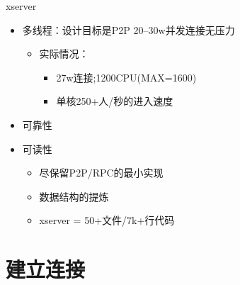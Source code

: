 \documentclass{beamer}
\begin{document}
\begin{frame}[t]{xserver}
    \begin{itemize}
        \item 多线程：设计目标是P2P 20--30w并发连接无压力
            \begin{itemize}
                \item 实际情况：
                    \begin{itemize}
                        \item 27w连接;1200CPU(MAX=1600)
                        \item 单核250+人/秒的进入速度
                    \end{itemize}
            \end{itemize}
        \item 可靠性
        \item 可读性
            \begin{itemize}
                \item 尽保留P2P/RPC的最小实现
                \item 数据结构的提炼
                \item xserver = 50+文件/7k+行代码
            \end{itemize}
    \end{itemize}
\end{frame}

\section{建立连接}
\end{document}

